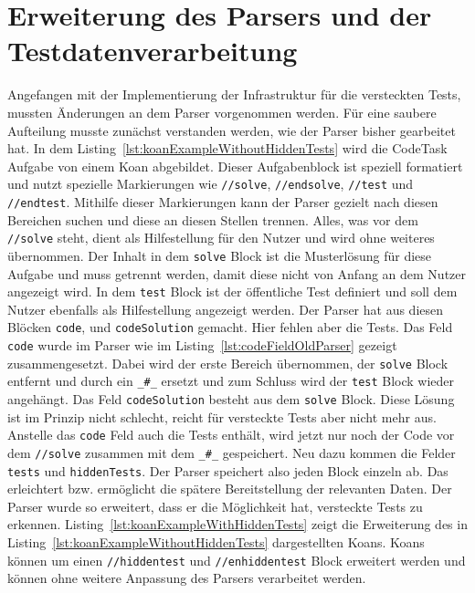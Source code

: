 \section{Erweiterung des Parsers und der Testdatenverarbeitung}
Angefangen mit der Implementierung der Infrastruktur für die versteckten Tests, mussten Änderungen an dem Parser vorgenommen werden. Für eine saubere Aufteilung musste zunächst verstanden werden, wie der Parser bisher gearbeitet hat. In dem Listing~\ref{lst:koanExampleWithoutHiddenTests} wird die CodeTask Aufgabe von einem Koan abgebildet. Dieser Aufgabenblock ist speziell formatiert und nutzt spezielle Markierungen wie \texttt{//solve}, \texttt{//endsolve}, \texttt{//test} und \texttt{//endtest}. Mithilfe dieser Markierungen kann der Parser gezielt nach diesen Bereichen suchen und diese an diesen Stellen trennen.
Alles, was vor dem \texttt{//solve} steht, dient als Hilfestellung für den Nutzer und wird ohne weiteres übernommen. Der Inhalt in dem \texttt{solve} Block ist die Musterlösung für diese Aufgabe und muss getrennt werden, damit diese nicht von Anfang an dem Nutzer angezeigt wird. In dem \texttt{test} Block ist der öffentliche Test definiert und soll dem Nutzer ebenfalls als Hilfestellung angezeigt werden.
Der Parser hat aus diesen Blöcken \texttt{code}, und \texttt{codeSolution} gemacht. Hier fehlen aber die Tests. Das Feld \texttt{code} wurde im Parser wie im Listing~\ref{lst:codeFieldOldParser} gezeigt zusammengesetzt. Dabei wird der erste Bereich übernommen, der \texttt{solve} Block entfernt und durch ein \texttt{\_\#\_} ersetzt und zum Schluss wird der \texttt{test} Block wieder angehängt. Das Feld \texttt{codeSolution} besteht aus dem \texttt{solve} Block.
Diese Lösung ist im Prinzip nicht schlecht, reicht für versteckte Tests aber nicht mehr aus.
Anstelle das \texttt{code} Feld auch die Tests enthält, wird jetzt nur noch der Code vor dem \texttt{//solve} zusammen mit dem \texttt{\_\#\_} gespeichert. Neu dazu kommen die Felder \texttt{tests} und \texttt{hiddenTests}. Der Parser speichert also jeden Block einzeln ab. Das erleichtert bzw. ermöglicht die spätere Bereitstellung der relevanten Daten.
Der Parser wurde so erweitert, dass er die Möglichkeit hat, versteckte Tests zu erkennen. Listing~\ref{lst:koanExampleWithHiddenTests} zeigt die Erweiterung des in Listing~\ref{lst:koanExampleWithoutHiddenTests} dargestellten Koans. Koans können um einen \texttt{//hiddentest} und \texttt{//enhiddentest} Block erweitert werden und können ohne weitere Anpassung des Parsers verarbeitet werden.

